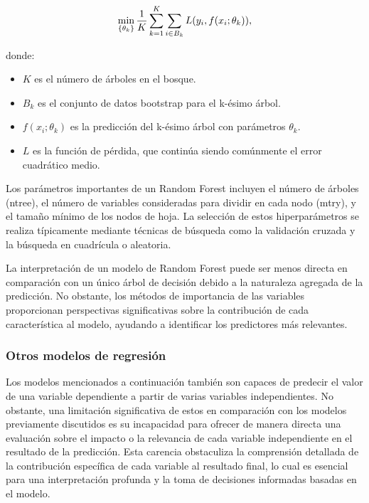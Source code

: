 \documentclass[
  11pt,
  bookmarksnumbered]{article}
\providecommand{\tightlist}{%
  \setlength{\itemsep}{0pt}\setlength{\parskip}{0pt}}
\begin{document}

\begin{equation}
\large \min_{\{\theta_k\}} \frac{1}{K} \sum_{k=1}^{K} \sum_{i \in B_k} L(y_i, f(x_i;\theta_k)),
\end{equation}

donde:

\begin{itemize}
\tightlist
\item
  \(K\) es el número de árboles en el bosque.
\item
  \(B_k\) es el conjunto de datos bootstrap para el k-ésimo árbol.
\item
  \(f(x_i;\theta_k)\) es la predicción del k-ésimo árbol con parámetros \(\theta_k\).
\item
  \(L\) es la función de pérdida, que continúa siendo comúnmente el error cuadrático medio.
\end{itemize}

Los parámetros importantes de un Random Forest incluyen el número de árboles (ntree), el número de variables consideradas para dividir en cada nodo (mtry), y el tamaño mínimo de los nodos de hoja.
La selección de estos hiperparámetros se realiza típicamente mediante técnicas de búsqueda como la validación cruzada y la búsqueda en cuadrícula o aleatoria.

La interpretación de un modelo de Random Forest puede ser menos directa en comparación con un único árbol de decisión debido a la naturaleza agregada de la predicción.
No obstante, los métodos de importancia de las variables proporcionan perspectivas significativas sobre la contribución de cada característica al modelo, ayudando a identificar los predictores más relevantes.

\hypertarget{otros-modelos-de-regresiuxf3n}{%
\subsubsection{Otros modelos de regresión}\label{otros-modelos-de-regresiuxf3n}}

Los modelos mencionados a continuación también son capaces de predecir el valor de una variable dependiente a partir de varias variables independientes.
No obstante, una limitación significativa de estos en comparación con los modelos previamente discutidos es su incapacidad para ofrecer de manera directa una evaluación sobre el impacto o la relevancia de cada variable independiente en el resultado de la predicción.
Esta carencia obstaculiza la comprensión detallada de la contribución específica de cada variable al resultado final, lo cual es esencial para una interpretación profunda y la toma de decisiones informadas basadas en el modelo.
\end{document}
